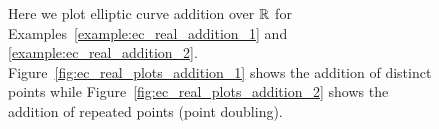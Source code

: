 \begin{figure}[p]
\caption[Plots of elliptic curve addition over the reals]{Here
    we plot elliptic curve addition over $\mathbb{R}$
    for Examples~\ref{example:ec_real_addition_1}
    and \ref{example:ec_real_addition_2}.
    Figure~\ref{fig:ec_real_plots_addition_1} shows the addition
    of distinct points while
    Figure~\ref{fig:ec_real_plots_addition_2} shows the addition
    of repeated points (point doubling).}
\label{fig:ec_real_plots_addition}
\end{figure}
